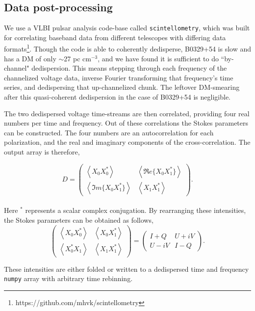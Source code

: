 \subsection{Data post-processing}
\label{sec-b0329analysis}

We use a VLBI pulsar analysis code-base called 
{\tt scintellometry}, which was built for 
correlating baseband data from different telescopes 
with differing data formats\footnote{https://github.com/mhvk/scintellometry}. 
Though the code is able to coherently dedisperse, 
B0329+54 is slow and has a DM of only 
$\sim$27 pc cm$^{-3}$, and we have found it is sufficient to do ``by-channel" 
dedispersion. This means stepping through each frequency 
of the channelized voltage data, inverse Fourier transforming 
that frequency's time series, and dedispersing that up-channelized 
chunk. The leftover DM-smearing after this quasi-coherent 
dedispersion in the case of 
B0329+54 is negligible. 

The two dedispersed voltage time-streams are then correlated, 
providing four real numbers per time and frequency. 
Out of these correlations the Stokes parameters 
can be constructed. The four numbers are an autocorrelation for each 
polarization, and the real and imaginary components of the
cross-correlation. The output array is therefore,

\begin{equation}
D = \begin{pmatrix}
\left< X_0X_0^*\right> & \left< \Re e\{X_0X_1^*\}\right >\\ 
 \left< \Im m\{X_0X_1^*\}\right > & \left< X_1X_1^*\right>
\end{pmatrix}.
\end{equation}
\\
\noindent Here $^*$ represents a scalar complex conjugation. 
By rearranging these intensities, the Stokes parameters can 
be obtained as follows,
\\
\begin{equation}
\begin{pmatrix}
\left< X_0X_0^*\right> & \left< X_0X_1^*\right >\\ 
 \left< X_0^*X_1 \right > & \left< X_1X_1^*\right>
\end{pmatrix} = 
\begin{pmatrix}
I + Q & U + iV\\ 
U -iV & I - Q
\end{pmatrix}.
\end{equation}


\noindent These intensities are either folded 
or written to a dedispersed time and frequency {\tt numpy} 
array with arbitrary time rebinning. 

